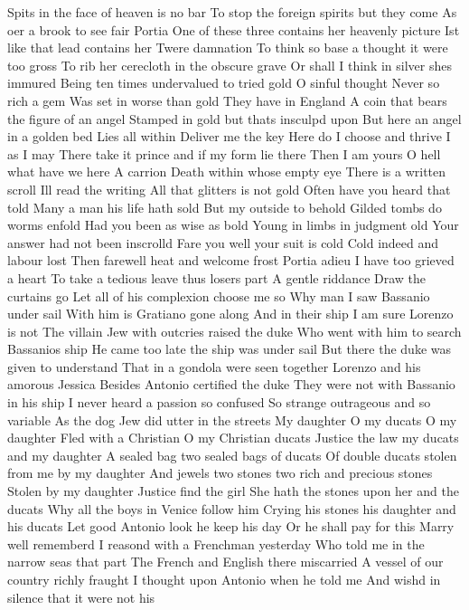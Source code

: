 Spits in the face of heaven is no bar
To stop the foreign spirits but they come
As oer a brook to see fair Portia
One of these three contains her heavenly picture
Ist like that lead contains her Twere damnation
To think so base a thought it were too gross
To rib her cerecloth in the obscure grave
Or shall I think in silver shes immured
Being ten times undervalued to tried gold
O sinful thought Never so rich a gem
Was set in worse than gold They have in England
A coin that bears the figure of an angel
Stamped in gold but thats insculpd upon
But here an angel in a golden bed
Lies all within Deliver me the key
Here do I choose and thrive I as I may
There take it prince and if my form lie there
Then I am yours
O hell what have we here
A carrion Death within whose empty eye
There is a written scroll Ill read the writing
All that glitters is not gold
Often have you heard that told
Many a man his life hath sold
But my outside to behold
Gilded tombs do worms enfold
Had you been as wise as bold
Young in limbs in judgment old
Your answer had not been inscrolld
Fare you well your suit is cold
Cold indeed and labour lost
Then farewell heat and welcome frost
Portia adieu I have too grieved a heart
To take a tedious leave thus losers part
A gentle riddance Draw the curtains go
Let all of his complexion choose me so
Why man I saw Bassanio under sail
With him is Gratiano gone along
And in their ship I am sure Lorenzo is not
The villain Jew with outcries raised the duke
Who went with him to search Bassanios ship
He came too late the ship was under sail
But there the duke was given to understand
That in a gondola were seen together
Lorenzo and his amorous Jessica
Besides Antonio certified the duke
They were not with Bassanio in his ship
I never heard a passion so confused
So strange outrageous and so variable
As the dog Jew did utter in the streets
My daughter O my ducats O my daughter
Fled with a Christian O my Christian ducats
Justice the law my ducats and my daughter
A sealed bag two sealed bags of ducats
Of double ducats stolen from me by my daughter
And jewels two stones two rich and precious stones
Stolen by my daughter Justice find the girl
She hath the stones upon her and the ducats
Why all the boys in Venice follow him
Crying his stones his daughter and his ducats
Let good Antonio look he keep his day
Or he shall pay for this
Marry well rememberd
I reasond with a Frenchman yesterday
Who told me in the narrow seas that part
The French and English there miscarried
A vessel of our country richly fraught
I thought upon Antonio when he told me
And wishd in silence that it were not his

